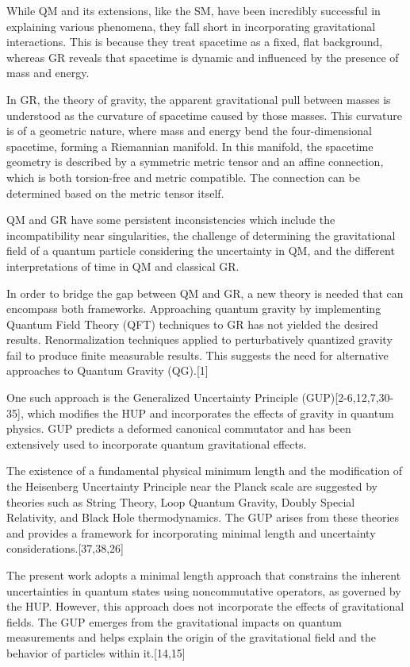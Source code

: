 \documentclass{article}
\begin{document}
While QM and its extensions, like the SM, have been incredibly successful in explaining various phenomena, they fall short in incorporating gravitational interactions. This is because they treat spacetime as a fixed, flat background, whereas GR reveals that spacetime is dynamic and influenced by the presence of mass and energy.

In GR, the theory of gravity, the apparent gravitational pull between masses is understood as the curvature of spacetime caused by those masses. This curvature is of a geometric nature, where mass and energy bend the four-dimensional spacetime, forming a Riemannian manifold. In this manifold, the spacetime geometry is described by a symmetric metric tensor and an affine connection, which is both torsion-free and metric compatible. The connection can be determined based on the metric tensor itself.

QM and GR have some persistent inconsistencies which include the incompatibility near singularities, the challenge of determining the gravitational field of a quantum particle considering the uncertainty in QM, and the different interpretations of time in QM and classical GR.

In order to bridge the gap between QM and GR, a new theory is needed that can encompass both frameworks. Approaching quantum gravity by implementing Quantum Field Theory (QFT) techniques to GR has not yielded the desired results. Renormalization techniques applied to perturbatively quantized gravity fail to produce finite measurable results. This suggests the need for alternative approaches to Quantum Gravity (QG).[1]

One such approach is the Generalized Uncertainty Principle (GUP)[2-6,12,7,30-35], which modifies the HUP and incorporates the effects of gravity in quantum physics. GUP predicts a deformed canonical commutator and has been extensively used to incorporate quantum gravitational effects. 

The existence of a fundamental physical minimum length and the modification of the Heisenberg Uncertainty Principle near the Planck scale are suggested by theories such as String Theory, Loop Quantum Gravity, Doubly Special Relativity, and Black Hole thermodynamics. The GUP arises from these theories and provides a framework for incorporating minimal length and uncertainty considerations.[37,38,26]

The present work adopts a minimal length approach that constrains the inherent uncertainties in quantum states using noncommutative operators, as governed by the HUP. However, this approach does not incorporate the effects of gravitational fields. The GUP emerges from the gravitational impacts on quantum measurements and helps explain the origin of the gravitational field and the behavior of particles within it.[14,15]
\end{document}
